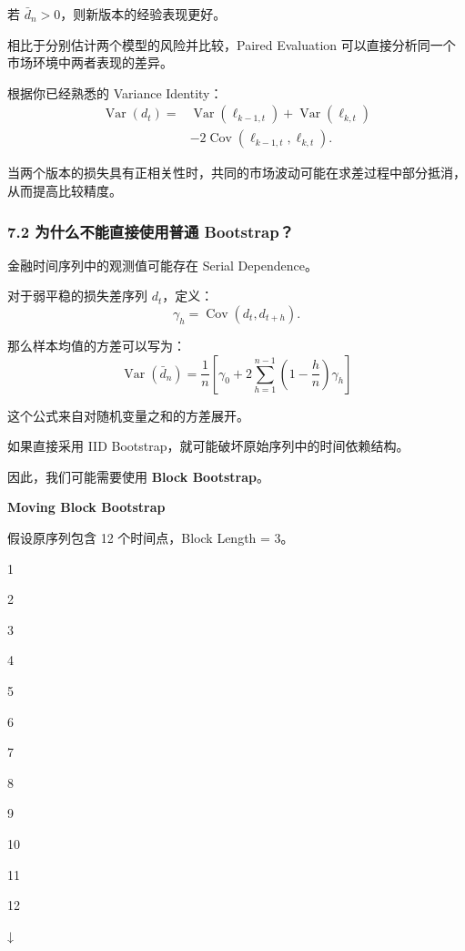 若 \(\bar d_n>0\)，则新版本的经验表现更好。

相比于分别估计两个模型的风险并比较，Paired Evaluation 可以直接分析同一个市场环境中两者表现的差异。

根据你已经熟悉的 Variance Identity：
\[\begin{aligned}
\operatorname{Var}(d_t)
={}&
\operatorname{Var}(\ell_{k-1,t})
+\operatorname{Var}(\ell_{k,t})\\
&-2\operatorname{Cov}
(\ell_{k-1,t},\ell_{k,t}).
\end{aligned}\]

当两个版本的损失具有正相关性时，共同的市场波动可能在求差过程中部分抵消，从而提高比较精度。

\hypertarget{part-2-27-0001-ux4e3aux4ec0ux4e48ux4e0dux80fdux76f4ux63a5ux4f7fux7528ux666eux901a-bootstrap}{%
\subsubsection{7.2 为什么不能直接使用普通 Bootstrap？}\label{part-2-27-0001-ux4e3aux4ec0ux4e48ux4e0dux80fdux76f4ux63a5ux4f7fux7528ux666eux901a-bootstrap}}

金融时间序列中的观测值可能存在 Serial Dependence。

对于弱平稳的损失差序列 \(d_t\)，定义：
\[\gamma_h=\operatorname{Cov}(d_t,d_{t+h}).\]

那么样本均值的方差可以写为：
\[\boxed{
\operatorname{Var}(\bar d_n)
=
\frac1n
\left[
\gamma_0+
2\sum_{h=1}^{n-1}
\left(1-\frac hn\right)\gamma_h
\right]
}\]

这个公式来自对随机变量之和的方差展开。

如果直接采用 IID Bootstrap，就可能破坏原始序列中的时间依赖结构。

因此，我们可能需要使用 \textbf{Block Bootstrap}。

\textbf{Moving Block Bootstrap}

假设原序列包含 12 个时间点，Block Length = 3。

1

2

3

4

5

6

7

8

9

10

11

12

↓

